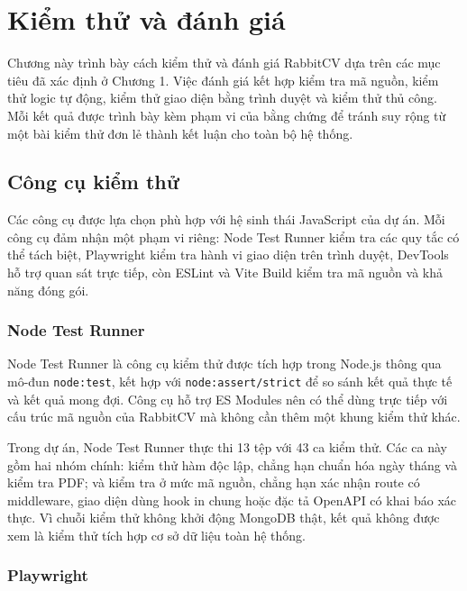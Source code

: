 \providecommand{\text}[1]{\relax\ifmmode\mbox{#1}\else#1\fi}
\chapter{Kiểm thử và đánh giá}
\label{chap:testing-evaluation}

Chương này trình bày cách kiểm thử và đánh giá RabbitCV dựa trên các mục tiêu đã xác định ở Chương 1. Việc đánh giá kết hợp kiểm tra mã nguồn, kiểm thử logic tự động, kiểm thử giao diện bằng trình duyệt và kiểm thử thủ công. Mỗi kết quả được trình bày kèm phạm vi của bằng chứng để tránh suy rộng từ một bài kiểm thử đơn lẻ thành kết luận cho toàn bộ hệ thống.

\section{Công cụ kiểm thử}
\label{sec:testing-tools}

Các công cụ được lựa chọn phù hợp với hệ sinh thái JavaScript của dự án. Mỗi công cụ đảm nhận một phạm vi riêng: Node Test Runner kiểm tra các quy tắc có thể tách biệt, Playwright kiểm tra hành vi giao diện trên trình duyệt, DevTools hỗ trợ quan sát trực tiếp, còn ESLint và Vite Build kiểm tra mã nguồn và khả năng đóng gói.

\subsection{Node Test Runner}

Node Test Runner là công cụ kiểm thử được tích hợp trong Node.js thông qua mô-đun \texttt{node:test}, kết hợp với \texttt{node:assert/strict} để so sánh kết quả thực tế và kết quả mong đợi. Công cụ hỗ trợ ES Modules nên có thể dùng trực tiếp với cấu trúc mã nguồn của RabbitCV mà không cần thêm một khung kiểm thử khác.

Trong dự án, Node Test Runner thực thi 13 tệp với 43 ca kiểm thử. Các ca này gồm hai nhóm chính: kiểm thử hàm độc lập, chẳng hạn chuẩn hóa ngày tháng và kiểm tra PDF; và kiểm tra ở mức mã nguồn, chẳng hạn xác nhận route có middleware, giao diện dùng hook in chung hoặc đặc tả OpenAPI có khai báo xác thực. Vì chuỗi kiểm thử không khởi động MongoDB thật, kết quả không được xem là kiểm thử tích hợp cơ sở dữ liệu toàn hệ thống.

\subsection{Playwright}

